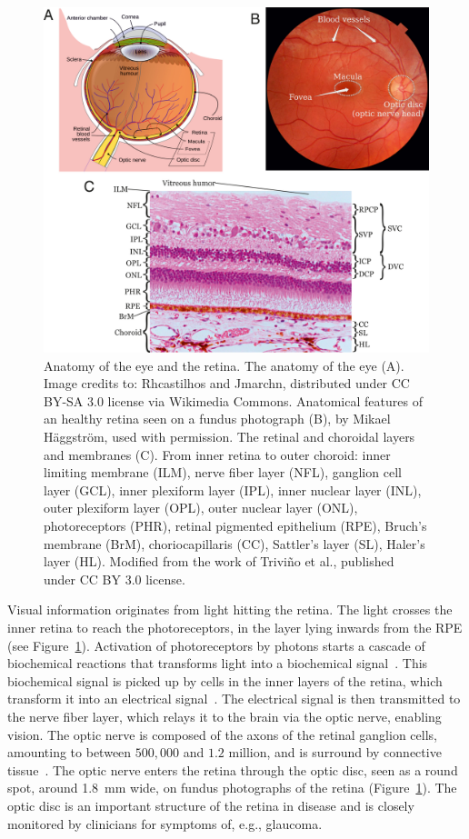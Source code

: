\documentclass{article}
\begin{document}
\begin{figure}[t!]
  \centering
  \includegraphics[width=.95\textwidth]{Figure1}
  \caption{Anatomy of the eye and the retina. The anatomy of the eye (A). Image credits to: Rhcastilhos and Jmarchn, distributed under CC BY-SA 3.0 license via Wikimedia Commons. Anatomical features of an healthy retina seen on a fundus photograph (B), by Mikael H\"aggstr\"om, used with permission. The retinal and choroidal layers and membranes (C). From inner retina to outer choroid: inner limiting membrane (ILM), nerve fiber layer (NFL), ganglion cell layer (GCL), inner plexiform layer (IPL), inner nuclear layer (INL), outer plexiform layer (OPL), outer nuclear layer (ONL), photoreceptors (PHR), retinal pigmented epithelium (RPE), Bruch's membrane (BrM), choriocapillaris (CC), Sattler's layer (SL), Haler's layer (HL). Modified from the work of Trivi\~no et al., published under CC BY 3.0 license.~\cite{Trivino_2012}}
  \label{fig:architecture-eye}
\end{figure}


Visual information originates from light hitting the retina.
The light crosses the inner retina to reach the photoreceptors, in the layer lying inwards from the RPE (see Figure~\ref{fig:architecture-eye}).
Activation of photoreceptors by photons starts a cascade of biochemical reactions that transforms light into a biochemical signal~\cite{Hurley_2009}.
This biochemical signal is picked up by cells in the inner layers of the retina, which transform it into an electrical signal~\cite{Arslan_2018}.
The electrical signal is then transmitted to the nerve fiber layer, which relays it to the brain via the optic nerve, enabling vision.
The optic nerve is composed of the axons of the retinal ganglion cells, amounting to between $500,000$ and $1.2$ million, and is surround by connective tissue~\cite{Salazar_2019}.
The optic nerve enters the retina through the optic disc, seen as a round spot, around \SI{1.8}{\mm} wide, on fundus photographs of the retina (Figure~\ref{fig:architecture-eye}).
The optic disc is an important structure of the retina in disease and is closely monitored by clinicians for symptoms of, e.g., glaucoma.
\end{document}
